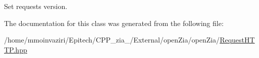 Set request\textquotesingle{}s version. 



The documentation for this class was generated from the following file\+:\begin{DoxyCompactItemize}
\item 
/home/mmoinvaziri/\+Epitech/\+C\+P\+P\+\_\+zia\+\_/\+External/open\+Zia/open\+Zia/\mbox{\hyperlink{_request_h_t_t_p_8hpp}{Request\+H\+T\+T\+P.\+hpp}}\end{DoxyCompactItemize}
